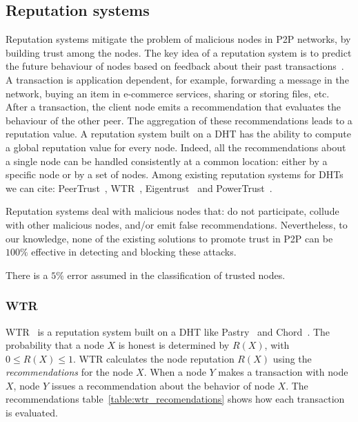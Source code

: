 \subsection{Reputation systems}
\label{sec:reputation_systems}
Reputation systems mitigate the problem of malicious nodes in
P2P networks, by building trust among the nodes. The key
idea of a reputation system is to predict the future behaviour
of nodes based on feedback about their past
transactions~\cite{Resnick:2000:RS:355112.355122}. A
transaction is application dependent, for example, forwarding a
message in the network, buying an item in e-commerce services,
sharing or storing files, etc. After a transaction, the client node emits
a recommendation that evaluates the behaviour of the other peer.
The aggregation of these recommendations leads to a reputation
value.
A reputation system built on a DHT has the ability
to compute a global reputation value for every node. Indeed,
all the recommendations about a single node can be handled
consistently at a common location: either by a specific node
or by a set of nodes. Among existing reputation systems for
DHTs we can cite: PeerTrust~\cite{xiong2004peertrust}, WTR~\cite{bonnaire2009wtr},
Eigentrust~\cite{kamvar2003eigentrust} and
PowerTrust~\cite{rahbar2007powertrust}.

Reputation systems deal with malicious nodes that:
do not participate, collude with other malicious nodes, and/or
emit false recommendations. Nevertheless, to our knowledge,
none of the existing solutions to promote trust in P2P can be
$100\%$ effective in detecting and blocking these attacks.

There is a $5\%$ error assumed in the classification of trusted nodes.

\subsubsection{WTR}
\label{sec:wtr}
WTR~\cite{bonnaire2009wtr} is a reputation system built on a DHT like Pastry~\cite{pastry} and
Chord~\cite{chord}. The probability that a node $X$ is honest is determined by
$R(X)$, with $0 \leq R(X) \leq 1$. WTR calculates the node reputation $R(X)$
using the \textit{recommendations} for the node $X$. When a node $Y$ makes a transaction with
node $X$, node $Y$ issues a recommendation about the behavior of node
$X$. The recommendations table~\ref{table:wtr_recomendations} shows how each
transaction is evaluated.
 

